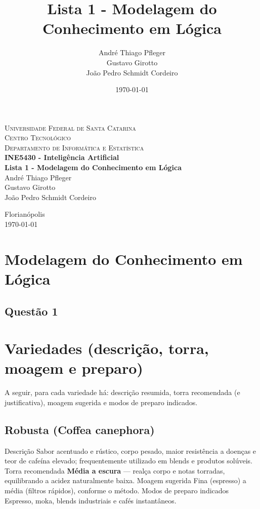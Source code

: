 \documentclass[a4paper,12pt]{article}
\title{Lista 1 - Modelagem do Conhecimento em Lógica }
\author{André Thiago Pfleger \\  Gustavo Girotto \\ João Pedro Schmidt Cordeiro}
\date{\today}
\begin{document}
\begin{titlepage}
   \begin{center}
      \textsc{Universidade Federal de Santa Catarina} \\
      \textsc{Centro Tecnológico} \\
      \textsc{Departamento de Informática e Estatística} \\[4cm]

      \textbf{\Large{INE5430 - Inteligência Artificial}} \\[2cm]

      \textbf{\huge{Lista 1 - Modelagem do Conhecimento em Lógica }} \\[3cm]

      André Thiago Pfleger \\
      Gustavo Girotto \\
      João Pedro Schmidt Cordeiro \\
      
      \vfill
      
      {Florianópolis} \\
      {\today}
   \end{center}
\end{titlepage}

\section{Modelagem do Conhecimento em Lógica}
\subsection{Questão 1}
\section{Variedades (descrição, torra, moagem e preparo)}
A seguir, para cada variedade há: descrição resumida, torra recomendada (e justificativa), moagem sugerida e modos de preparo indicados.

\subsection{Robusta (Coffea canephora)}
{Descrição} Sabor acentuado e rústico, corpo pesado, maior resistência a doenças e teor de cafeína elevado; frequentemente utilizado em blends e produtos solúveis.  
{Torra recomendada} \textbf{Média a escura} — realça corpo e notas torradas, equilibrando a acidez naturalmente baixa.  
{Moagem sugerida} Fina (espresso) a média (filtros rápidos), conforme o método.  
{Modos de preparo indicados} Espresso, moka, blends industriais e cafés instantâneos.
\end{document}
